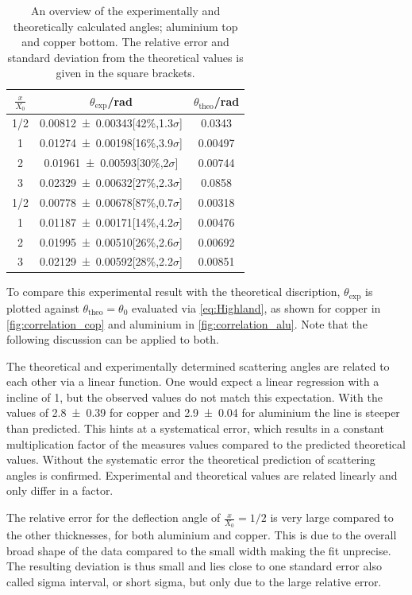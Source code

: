 \documentclass[sn-mathphys-num,iicol]{sn-jnl}
\theoremstyle{thmstyleone}
\theoremstyle{thmstyletwo}
\theoremstyle{thmstylethree}
\begin{document}
\begin{table}
  \begin{tabular}{ccc}
    \toprule
    $\tfrac{x}{X_0}$ & $\theta _\text{exp}$/rad & $\theta _\text{theo}$/rad \\
    \midrule
    1/2 & \num{.00812+-.00343}[42\%,1.3$\sigma$] & 0.0343\\
    1 & \num{.01274+-.00198}[16\%,3.9$\sigma$] & 0.00497\\
    2 & \num{.01961+-.00593}[30\%,2$\sigma$] & 0.00744\\
    3 & \num{.02329+-.00632}[27\%,2.3$\sigma$] & 0.0858\\
    \midrule
    1/2 & \num{.00778+-.00678}[87\%,0.7$\sigma$] & 0.00318\\
    1 & \num{.01187+-.00171}[14\%,4.2$\sigma$] & 0.00476\\
    2 & \num{.01995+-.00510}[26\%,2.6$\sigma$] & 0.00692\\
    3 & \num{.02129+-.00592}[28\%,2.2$\sigma$] & 0.00851\\
    \bottomrule
  \end{tabular}
  \caption{An overview of the experimentally and theoretically calculated angles; aluminium top and copper bottom. 
  The relative error and standard deviation from the theoretical values is given in the square brackets.}
\end{table}
To compare this experimental result with the theoretical discription, $\theta_\text{exp}$ is plotted against $\theta_\text{theo} = \theta_0$ evaluated via \autoref{eq:Highland}, as shown for copper in \autoref{fig:correlation_cop} and aluminium in \autoref{fig:correlation_alu}.
Note that the following discussion can be applied to both. 

The theoretical and experimentally determined scattering angles are related to each other via a linear function.
One would expect a linear regression with a incline of 1, but the observed values do not match this expectation.
With the values of \SI{2.8\pm0.39}{} for copper and \SI{2.9\pm0.04}{} for aluminium the line is steeper than predicted.
This hints at a systematical error, which results in a constant multiplication factor of the measures values compared to the predicted theoretical values.
Without the systematic error the theoretical prediction of scattering angles is confirmed.
Experimental and theoretical values are related linearly and only differ in a factor.

The relative error for the deflection angle of $\tfrac{x}{X_0}=1/2$ is very large compared to the other thicknesses, for both aluminium and copper.
This is due to the overall broad shape of the data compared to the small width making the fit unprecise.
The resulting deviation is thus small and lies close to one standard error also called sigma interval, or short sigma, but only due to the large relative error.
\end{document}
